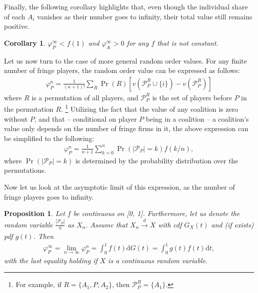 \documentclass[a4paper]{article}
\newtheorem{proposition}{Proposition}
\newtheorem{corollary}{Corollary}
\newcommand{\dt}{\mathrm{d}t}
\begin{document}
Finally, the following corollary highlights that, even though the individual share of each $A_i$ vanishes as their number goes to infinity, their total value still remains positive.
\begin{corollary}
    \label{cor:fringe_value_2}
    $\varphi_P^\infty < f(1)$ and $\varphi_A^\infty > 0$ for any $f$ that is not constant.
\end{corollary}


Let us now turn to the case of more general random order values.
For any finite number of fringe players, the random order value can be expressed as follows:
\begin{align*}
    \varphi_P^n = \frac{1}{(n+1)!} \sum_{R} \Pr(R) [ v(\mathcal{P}_P^R \cup \{i\}) - v(\mathcal{P}_P^R) ]
\end{align*}
where $R$ is a permutation of all players, and $\mathcal{P}_P^R$ is the set of players before $P$ in the permutation $R$. \footnote{
    For example, if $R = \{A_1, P, A_2\}$, then $\mathcal{P}_P^R = \{A_1\}$.
}
Utilizing the fact that the value of any coalition is zero without $P$, and that -- conditional on player $P$ being in a coalition -- a coalition's value only depends on the number of fringe firms in it, the above expression can be simplified to the following:
\begin{align*}
    \varphi_P^n = \frac{1}{n+1} \sum_{k=0}^n \Pr(|\mathcal{P}_P| = k) f(k/n),
\end{align*}
where $\Pr(|\mathcal{P}_P| = k)$ is determined by the probability distribution over the permutations.

Now let us look at the asymptotic limit of this expression, as the number of fringe players goes to infinity.

\begin{proposition}
    \label{prop:one_sided_general}
    Let $f$ be continuous on [0, 1]. Furthermore, let us denote the random variable $\frac{|\mathcal{P}_P|}{n}$ as $X_n$. Assume that $X_n \xrightarrow[]{d} X$ with cdf $G_X(t)$ and (if exists) pdf $g(t)$.
    Then
    \begin{align*}
        \varphi_P^\infty = \lim_{n \to \infty} \varphi_P^n = \int_0^1 f(t) \mathrm{d}G(t) = \int_0^1 g(t) f(t) \dt,
    \end{align*}
    with the last equality holding if $X$ is a continuous random variable.
\end{proposition}
\end{document}
